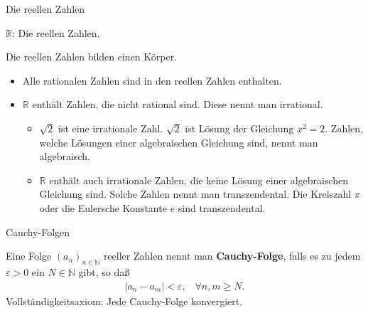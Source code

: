 \documentclass[german]{beamer}
\newcommand{\bq}{\begin{eqnarray*}}
\newcommand{\eq}{\end{eqnarray*}}
\newcommand{\eps}{\varepsilon}
\begin{document}
\begin{frame}{Die reellen Zahlen}

\alert{${\mathbb R}$}: Die reellen Zahlen.

Die reellen Zahlen bilden einen K\"orper.

\begin{itemize}

\item Alle rationalen Zahlen sind in den reellen Zahlen enthalten.

\item $\mathbb R$ enth\"alt Zahlen, die nicht rational sind. 
Diese nennt man irrational.

\begin{itemize}

\item 
$\sqrt{2}$ ist eine irrationale Zahl.
$\sqrt{2}$ ist L\"osung der Gleichung $x^2=2$. 
Zahlen, welche L\"osungen einer algebraischen Gleichung sind, nennt man algebraisch.

\item
$\mathbb R$ enth\"alt auch irrationale Zahlen, die keine L\"osung einer algebraischen Gleichung sind.
Solche Zahlen nennt man transzendental. Die Kreiszahl $\pi$ oder die Eulersche Konstante $e$ sind
transzendental.

\end{itemize}

\end{itemize}

\end{frame}

\begin{frame}{Cauchy-Folgen}

Eine Folge $(a_n)_{n\in \mathbb N}$ reeller Zahlen nennt man {\bf Cauchy-Folge}, falls es zu jedem $\eps>0$ ein
$N\in \mathbb N$ gibt, so da{\ss}
\bq
 \left| a_n - a_m \right | < \eps, \;\;\; \forall n,m \ge N.
\eq
Vollst\"andigkeitsaxiom: Jede Cauchy-Folge konvergiert.

\end{frame}
\end{document}
